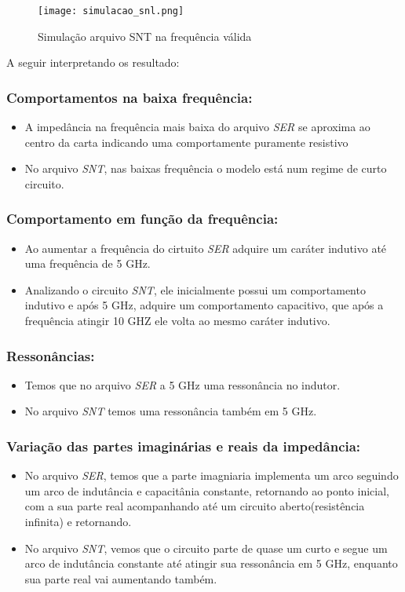 \documentclass[a4paper,12pt]{proc}
\begin{document}
\begin{figure}[htbp]
    \centering
    \texttt{[image: simulacao\_snl.png]}
    \caption{Simulação arquivo SNT na frequência válida}
    \label{Sim3}
\end{figure}


\noindent A seguir interpretando os resultado:

\subsubsection{Comportamentos na baixa frequência:}
\begin{itemize}
    \item A impedância na frequência mais baixa do arquivo \textit{SER} se aproxima ao centro da carta indicando uma comportamente puramente resistivo
    \item No arquivo \textit{SNT}, nas baixas frequência o modelo está num regime de curto circuito.
\end{itemize}

\subsubsection{Comportamento em função da frequência:}
\begin{itemize}
    \item Ao aumentar a frequência do cirtuito \textit{SER} adquire um caráter indutivo até uma frequência de 5 GHz.
    \item Analizando o circuito \textit{SNT}, ele inicialmente possui um comportamento indutivo e após 5 GHz, adquire um comportamento capacitivo, que após a frequência atingir 10 GHZ ele volta ao mesmo caráter indutivo.
\end{itemize}
 
\subsubsection{Ressonâncias:}
\begin{itemize}
    \item Temos que no arquivo \textit{SER} a 5 GHz uma ressonância no indutor.
    \item No arquivo \textit{SNT} temos uma ressonância também em 5 GHz.
\end{itemize}

\subsubsection{Variação das partes imaginárias e reais da impedância:}
\begin{itemize}
    \item No arquivo \textit{SER}, temos que a parte imagniaria implementa um arco seguindo um arco de indutância e capacitânia constante, retornando ao ponto inicial, com a sua parte real acompanhando até um circuito aberto(resistência infinita) e retornando.
    \item No arquivo \textit{SNT}, vemos que o circuito parte de quase um curto e segue um arco de indutância constante até atingir sua ressonância em 5 GHz, enquanto sua parte real vai aumentando também.
\end{itemize}
\end{document}
